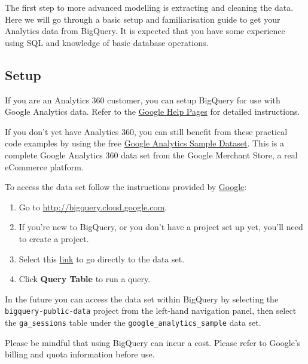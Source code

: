 \documentclass[]{book}
\begin{document}
The first step to more advanced modelling is extracting and cleaning the
data. Here we will go through a basic setup and familiarisation guide to
get your Analytics data from BigQuery. It is expected that you have some
experience using SQL and knowledge of basic database operations.

\hypertarget{setup-1}{\subsection{Setup}\label{setup-1}}

If you are an Analytics 360 customer, you can setup BigQuery for use
with Google Analytics data. Refer to the
\href{https://support.google.com/analytics/answer/3416092?hl=en\&ref_topic=3416089}{Google
Help Pages} for detailed instructions.

If you don't yet have Analytics 360, you can still benefit from these
practical code examples by using the free
\href{https://support.google.com/analytics/answer/7586738?hl=en\&ref_topic=3416089}{Google
Analytics Sample Dataset}. This is a complete Google Analytics 360 data
set from the Google Merchant Store, a real eCommerce platform.

To access the data set follow the instructions provided by
\href{https://support.google.com/analytics/answer/7586738?hl=en\&ref_topic=3416089}{Google}:

\begin{enumerate}
\def\labelenumi{\arabic{enumi}.}
\item
  Go to \url{http://bigquery.cloud.google.com}.
\item
  If you're new to BigQuery, or you don't have a project set up yet,
  you'll need to create a project.
\item
  Select this
  \href{https://bigquery.cloud.google.com/table/bigquery-public-data:google_analytics_sample.ga_sessions_20170801?pli=1}{link}
  to go directly to the data set.
\item
  Click \textbf{Query Table} to run a query.
\end{enumerate}

In the future you can access the data set within BigQuery by selecting
the \texttt{bigquery-public-data} project from the left-hand navigation
panel, then select the \texttt{ga\_sessions} table under the
\texttt{google\_analytics\_sample} data set.

Please be mindful that using BigQuery can incur a cost. Please refer to
Google's billing and quota information before use.
\end{document}
